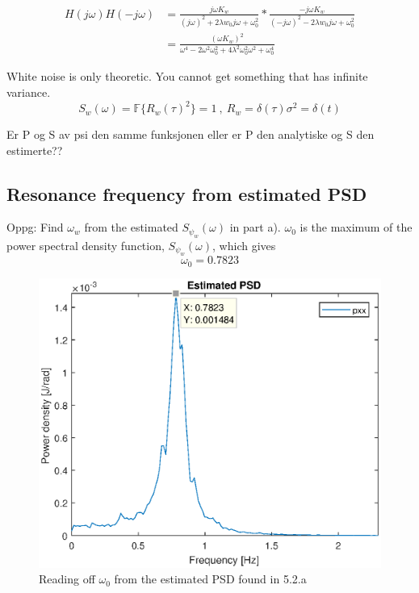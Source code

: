 \begin{equation}
\begin{split}
    H(j\omega)H(-j\omega) &= \frac{j\omega K_w}{(j\omega)^2 + 2\lambda w_0 j\omega + \omega_0^2}*\frac{-j \omega K_w}{(-j\omega)^2 - 2\lambda w_0 j\omega + \omega_0^2} \\
    &= \frac{(\omega K_w)^2}{\omega^4 - 2\omega^2 \omega_0^2 + 4 \lambda^2 \omega_0^2 \omega^2 + \omega_0^4}
\end{split}
\end{equation} 

White noise is only theoretic. You cannot get something that has infinite variance. 
\begin{equation*}
    S_w(\omega) = \mathbb{F} \{R_w(\tau)^2\} = 1 \ , \ R_w = \delta(\tau) \sigma^2 = \delta(t)
\end{equation*} 

Er P og S av psi den samme funksjonen eller er P den analytiske og S den estimerte??





\subsection{Resonance frequency from estimated PSD} \label{sec:5.2.c}
Oppg: Find $\omega_w$ from the estimated $S_{\psi_w}(\omega)$ in part a).
\newline
$\omega_0$ is the maximum of the power spectral density function, $S_{\psi_w}(\omega)$, which gives
\begin{equation}
    \omega_0 = 0.7823
\end{equation}

\begin{figure}[H]
    \centering
    \includegraphics[width=0.5\linewidth]{Part2_pics/p2c_omega0.eps}
    \caption{Reading off $\omega_0$ from the estimated PSD found in 5.2.a}
    \label{fig:p2c}
\end{figure}

